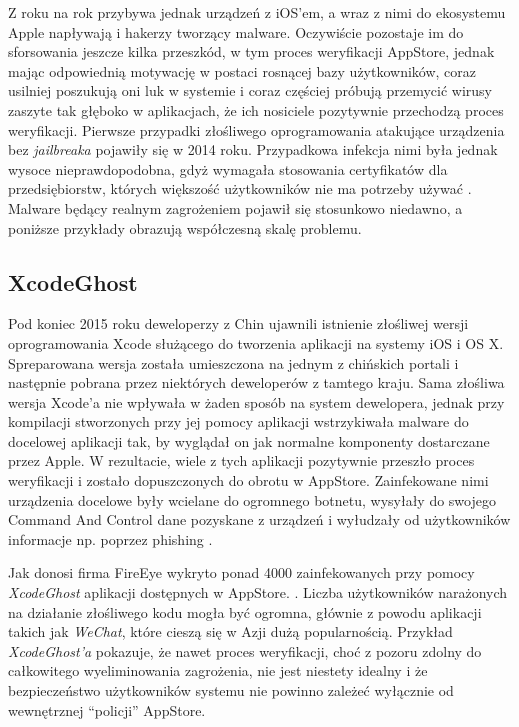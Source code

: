 \documentclass[polish]{kbk}
\begin{document}
Z roku na rok przybywa jednak urządzeń z iOS'em, a wraz z nimi do ekosystemu Apple napływają i hakerzy tworzący malware. Oczywiście pozostaje im do sforsowania jeszcze kilka przeszkód, w tym proces weryfikacji AppStore, jednak mając odpowiednią motywację w postaci rosnącej bazy użytkowników, coraz usilniej poszukują oni luk w systemie i coraz częściej próbują przemycić wirusy zaszyte tak głęboko w aplikacjach, że ich nosiciele pozytywnie przechodzą proces weryfikacji. Pierwsze przypadki złośliwego oprogramowania atakujące urządzenia bez \textit{jailbreaka} pojawiły się w 2014 roku. Przypadkowa infekcja nimi była jednak wysoce nieprawdopodobna, gdyż wymagała stosowania certyfikatów dla przedsiębiorstw, których większość użytkowników nie ma potrzeby używać \cite{ios-malware}. Malware będący realnym zagrożeniem pojawił się stosunkowo niedawno, a poniższe przykłady obrazują współczesną skalę problemu.

\subsection{XcodeGhost \cite{xcode-ghost}}
Pod koniec 2015 roku deweloperzy z Chin ujawnili istnienie złośliwej wersji oprogramowania Xcode służącego do tworzenia aplikacji na systemy iOS i OS X. Spreparowana wersja została umieszczona na jednym z chińskich portali i następnie pobrana przez niektórych deweloperów z tamtego kraju. Sama złośliwa wersja Xcode'a nie wpływała w żaden sposób na system dewelopera, jednak przy kompilacji stworzonych przy jej pomocy aplikacji wstrzykiwała malware do docelowej aplikacji tak, by wyglądał on jak normalne komponenty dostarczane przez Apple. W rezultacie, wiele z tych aplikacji pozytywnie przeszło proces weryfikacji i zostało dopuszczonych do obrotu w AppStore. Zainfekowane nimi urządzenia docelowe były wcielane do ogromnego botnetu, wysyłały do swojego Command And Control dane pozyskane z urządzeń i wyłudzały od użytkowników informacje np. poprzez phishing \cite{macrumors}.

Jak donosi firma FireEye wykryto ponad 4000 zainfekowanych przy pomocy \textit{XcodeGhost} aplikacji dostępnych w AppStore. \cite{fire-eye}. Liczba użytkowników narażonych na działanie złośliwego kodu mogła być ogromna, głównie z powodu aplikacji takich jak \textit{WeChat}, które cieszą się w Azji dużą popularnością. Przykład \textit{XcodeGhost'a} pokazuje, że nawet proces weryfikacji, choć z pozoru zdolny do całkowitego wyeliminowania zagrożenia, nie jest niestety idealny i że bezpieczeństwo użytkowników systemu nie powinno zależeć wyłącznie od wewnętrznej ``policji'' AppStore.
\end{document}
